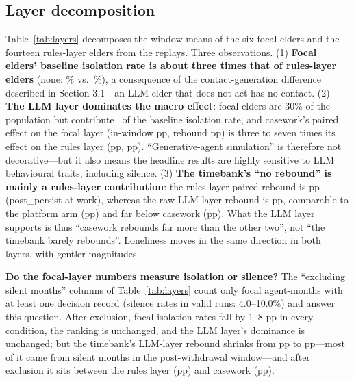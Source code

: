 \documentclass[10pt,twocolumn]{article}
\begin{document}
\subsection{Layer decomposition}\label{sec:layers}
Table~\ref{tab:layers} decomposes the window means of the six focal elders and the fourteen rules-layer elders from the replays. Three observations. (1) \textbf{Focal elders' baseline isolation rate is about three times that of rules-layer elders} (none: \FocIvNone\% vs.\ \RulIvNone\%), a consequence of the contact-generation difference described in Section 3.1---an LLM elder that does not act has no contact. (2) \textbf{The LLM layer dominates the macro effect}: focal elders are 30\% of the population but contribute \FocShareNone\ of the baseline isolation rate, and casework's paired effect on the focal layer (in-window \PFocIvCw pp, rebound \PFocRebCw pp) is three to seven times its effect on the rules layer (\PRulIvCw pp, \PRulRebCw pp). ``Generative-agent simulation'' is therefore not decorative---but it also means the headline results are highly sensitive to LLM behavioural traits, including silence. (3) \textbf{The timebank's ``no rebound'' is mainly a rules-layer contribution}: the rules-layer paired rebound is \PRulRebTb pp (post\_persist at work), whereas the raw LLM-layer rebound is \PFocRebTb pp, comparable to the platform arm (\PFocRebPf pp) and far below casework (\PFocRebCw pp). What the LLM layer supports is thus ``casework rebounds far more than the other two'', not ``the timebank barely rebounds''. Loneliness moves in the same direction in both layers, with gentler magnitudes.

\textbf{Do the focal-layer numbers measure isolation or silence?} The ``excluding silent months'' columns of Table~\ref{tab:layers} count only focal agent-months with at least one decision record (silence rates in valid runs: 4.0--10.0\%) and answer this question. After exclusion, focal isolation rates fall by 1--8 pp in every condition, the ranking is unchanged, and the LLM layer's dominance is unchanged; but the timebank's LLM-layer rebound shrinks from \PFocRebTb pp to \PFocActRebTb pp---most of it came from silent months in the post-withdrawal window---and after exclusion it sits between the rules layer (\PRulRebTb pp) and casework (\PFocActRebCw pp).
\end{document}
